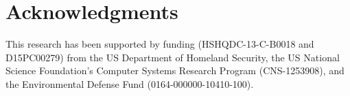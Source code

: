 \section*{Acknowledgments}
This research has been supported by funding (HSHQDC-13-C-B0018 and D15PC00279) from the US Department of Homeland Security, the US National Science Foundation's Computer Systems Research Program (CNS-1253908), and the Environmental Defense Fund (0164-000000-10410-100).
